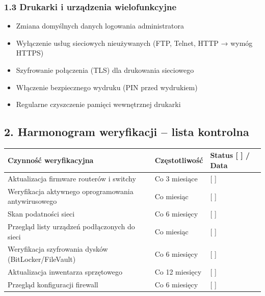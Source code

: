 \documentclass[12pt,a4paper]{article}
\providecommand{\tightlist}{\setlength{\itemsep}{0pt}\setlength{\parskip}{0pt}}
\begin{document}
\subsubsection{1.3 Drukarki i urządzenia
wielofunkcyjne}\label{drukarki-i-urzux105dzenia-wielofunkcyjne}

\begin{itemize}
\tightlist
\item
  Zmiana domyślnych danych logowania administratora
\item
  Wyłączenie usług sieciowych nieużywanych (FTP, Telnet, HTTP → wymóg
  HTTPS)
\item
  Szyfrowanie połączenia (TLS) dla drukowania sieciowego
\item
  Włączenie bezpiecznego wydruku (PIN przed wydrukiem)
\item
  Regularne czyszczenie pamięci wewnętrznej drukarki
\end{itemize}

\subsection{2. Harmonogram weryfikacji -- lista
kontrolna}\label{harmonogram-weryfikacji-lista-kontrolna}

\begin{longtable}[]{@{}>{\raggedright\arraybackslash}p{}>{\raggedright\arraybackslash}p{}>{\raggedright\arraybackslash}p{}@{}}
\toprule\noalign{}
Czynność weryfikacyjna & Częstotliwość & Status {[} {]} / Data \\
\midrule\noalign{}
\endhead
\bottomrule\noalign{}
\endlastfoot
Aktualizacja firmware routerów i switchy & Co 3 miesiące & {[} {]}
\underline{\hspace{2cm}} \\
Weryfikacja aktywnego oprogramowania antywirusowego & Co miesiąc & {[}
{]} \underline{\hspace{2cm}} \\
Skan podatności sieci & Co 6 miesięcy & {[} {]}
\underline{\hspace{2cm}} \\
Przegląd listy urządzeń podłączonych do sieci & Co miesiąc & {[} {]}
\underline{\hspace{2cm}} \\
Weryfikacja szyfrowania dysków (BitLocker/FileVault) & Co 6 miesięcy &
{[} {]} \underline{\hspace{2cm}} \\
Aktualizacja inwentarza sprzętowego & Co 12 miesięcy & {[} {]}
\underline{\hspace{2cm}} \\
Przegląd konfiguracji firewall & Co 6 miesięcy & {[} {]}
\underline{\hspace{2cm}} \\
\end{longtable}
\end{document}
